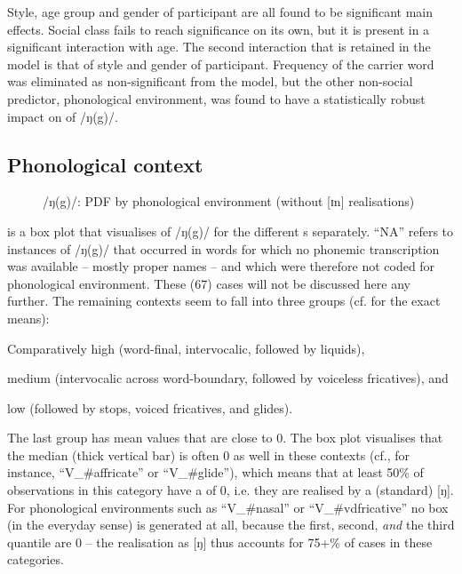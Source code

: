 Style, age group and gender of participant are all found to be significant main effects.
Social class fails to reach significance on its own, but it is present in a significant interaction with age.
The second interaction that is retained in the model is that of style and gender of participant.
Frequency of the carrier word was eliminated as non-significant from the model, but the other non-social predictor, phonological environment, was found to have a statistically robust impact on  of /ŋ(g)/.

\subsection{Phonological context}
\label{sec.prod.res.con.ng.phon}

\begin{figure}
	
		\resizebox{0.5\linewidth}{!}{} 
	\caption{/ŋ(g)/: PDF by phonological environment (without [ɪn] realisations)}
	\label{fig.box.ng.environment}
\end{figure}

 is a box plot that visualises  of /ŋ(g)/ for the different s separately.
``NA'' refers to instances of /ŋ(g)/ that occurred in words for which no phonemic transcription was available -- mostly proper names -- and which were therefore not coded for phonological environment.
These (67) cases will not be discussed here any further.
The remaining contexts seem to fall into three groups (cf.  for the exact means):
\begin{inparaenum}[(1)]
	\item Comparatively high  (word-final, intervocalic, followed by liquids),
	\item medium  (intervocalic across word-boundary, followed by voiceless fricatives), and
	\item low  (followed by stops, voiced fricatives, and glides).
\end{inparaenum}
The last group has mean  values that are close to 0.
The box plot visualises that the median (thick vertical bar) is often 0 as well in these contexts (cf., for instance, ``V\_\#affricate'' or ``V\_\#glide''), which means that at least 50\% of observations in this category have a  of 0, i.e. they are realised by a (standard) [ŋ].
For phonological environments such as ``V\_\#nasal'' or ``V\_\#vdfricative'' no box (in the everyday sense) is generated at all, because the first, second, \emph{and} the third quantile are 0 -- the realisation as [ŋ] thus accounts for 75+\% of cases in these categories.

